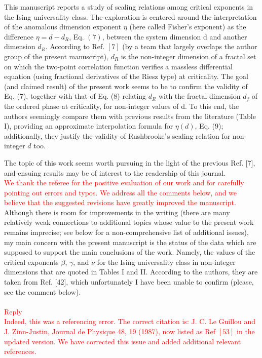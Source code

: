 \documentclass[prd,aps,nofootinbib]{revtex4}
\begin{document}
This manuscript reports a study of scaling relations among critical
exponents in the Ising universality class. The exploration is centered
around the interpretation of the anomalous dimension exponent $\eta$
(here called Fisher’s exponent) as the difference $\eta = d - d_R$, Eq.
$(7)$, between the system dimension d and another dimension $d_R$.
According to Ref. $[7]$ (by a team that largely overlaps the author
group of the present manuscript), $d_R$ is the non-integer dimension of
a fractal set on which the two-point correlation function verifies a
massless differential equation (using fractional derivatives of the
Riesz type) at criticality. The goal (and claimed result) of the
present work seems to be to confirm the validity of Eq. (7), together
with that of Eq. (8) relating $d_R$ with the fractal dimension $d_f$ of
the ordered phase at criticality, for non-integer values of d. To this
end, the authors seemingly compare them with previous results from the
literature (Table I), providing an approximate interpolation formula
for $\eta(d)$, Eq. (9); additionally, they justify the validity of
Rushbrooke$`$s scaling relation for non-integer $d$ too.

The topic of this work seems worth pursuing in the light of the
previous Ref. [7], and ensuing results may be of interest to the
readership of this journal.\\


\textcolor{red}{ We thank the referee for the positive evaluation of our work and for carefully pointing out errors and typos. We address all the comments below, and we believe that the suggested revisions have greatly improved the manuscript.}\\




Although there is room for improvements in
the writing (there are many relatively weak connections to additional
topics whose value to the present work remains imprecise; see below
for a non-comprehensive list of additional issues), my main concern
with the present manuscript is the status of the data which are
supposed to support the main conclusions of the work. Namely, the
values of the critical exponents $\beta$, $\gamma$, and $\nu$ for the Ising
universality class in non-integer dimensions that are quoted in Tables
I and II. According to the authors, they are taken from Ref. [42],
which unfortunately I have been unable to confirm (please, see the
comment below). \\
\\
\textcolor{red}{Reply}\\
\textcolor{red}{ Indeed, this was a referencing error. The correct citation is: J. C. Le Guillou and J. Zinn-Justin, Journal de Physique 48, 19 (1987), now listed as Ref $[53]$ in the updated version. We have corrected this issue and added additional relevant references.}\\
\\
\end{document}

